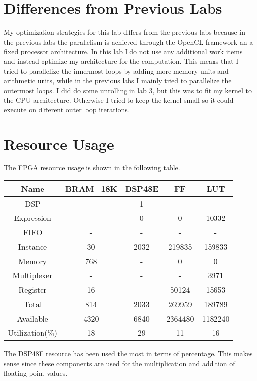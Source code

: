 \documentclass[12pt]{article}
\begin{document}
\section{Differences from Previous Labs}

My optimization strategies for this lab differs from the previous labs because in the previous labs the
parallelism is achieved through the OpenCL framework an a fixed processor architecture. In this lab
I do not use any additional work items and instead optimize my architecture for the computation.
This means that I tried to parallelize the innermost loops by adding more memory units and arithmetic
units, while in the previous labs I mainly tried to parallelize the outermost loops. I did do some
unrolling in lab 3, but this was to fit my kernel to the CPU architecture. Otherwise I tried to keep
the kernel small so it could execute on different outer loop iterations.

\section{Resource Usage}

The FPGA resource usage is shown in the following table.
\begin{center}
    \begin{tabular}{c|cccc}
        Name & BRAM\_18K & DSP48E & FF & LUT\\
        \hline
        DSP & - & 1 & - & -\\
        Expression & - & 0 & 0 & 10332\\
        FIFO & - & - & - & -\\
        Instance & 30 & 2032 & 219835 & 159833\\
        Memory & 768 & - & 0 & 0\\
        Multiplexer & - & - & - & 3971\\
        Register & 16 & - & 50124 & 15653\\
        \hline
        Total & 814 & 2033 & 269959 & 189789\\
        Available & 4320 & 6840 & 2364480 & 1182240\\
        \hline
        Utilization(\%) & 18 & 29 & 11 & 16
    \end{tabular}
\end{center}
The DSP48E resource has been used the most in terms of percentage. This makes sense since these components are used
for the multiplication and addition of floating point values.
\end{document}
